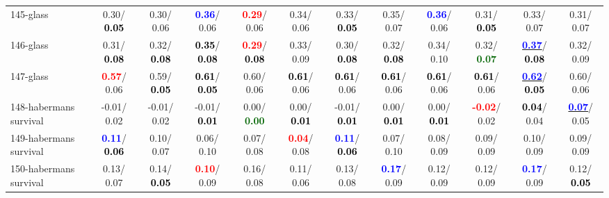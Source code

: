 \begin{table}[h]
\begin{center}
{\begin{tabular}{lc|c|c|c|c|c|c|c|c|c|c}
145-glass &   0.30/\textcolor{black}{\textbf{  0.05}} &   0.30/  0.06 & \textcolor{blue}{\textbf{  0.36}}/  0.06 & \textcolor{red}{\textbf{  0.29}}/  0.06 &   0.34/  0.06 &   0.33/\textcolor{black}{\textbf{  0.05}} &   0.35/  0.07 & \textcolor{blue}{\textbf{  0.36}}/  0.06 &   0.31/\textcolor{black}{\textbf{  0.05}} &   0.33/  0.07 &   0.31/  0.07 \\
146-glass &   0.31/\textcolor{black}{\textbf{  0.08}} &   0.32/\textcolor{black}{\textbf{  0.08}} & \textcolor{black}{\textbf{  0.35}}/\textcolor{black}{\textbf{  0.08}} & \textcolor{red}{\textbf{  0.29}}/\textcolor{black}{\textbf{  0.08}} &   0.33/  0.09 &   0.30/\textcolor{black}{\textbf{  0.08}} &   0.32/\textcolor{black}{\textbf{  0.08}} &   0.34/  0.10 &   0.32/\textcolor{darkgreen}{\textbf{  0.07}} & \underline{\textcolor{blue}{\textbf{  0.37}}}/\textcolor{black}{\textbf{  0.08}} &   0.32/  0.09 \\
147-glass & \textcolor{red}{\textbf{  0.57}}/  0.06 &   0.59/\textcolor{black}{\textbf{  0.05}} & \textcolor{black}{\textbf{  0.61}}/\textcolor{black}{\textbf{  0.05}} &   0.60/  0.06 & \textcolor{black}{\textbf{  0.61}}/  0.06 & \textcolor{black}{\textbf{  0.61}}/  0.06 & \textcolor{black}{\textbf{  0.61}}/  0.06 & \textcolor{black}{\textbf{  0.61}}/  0.06 & \textcolor{black}{\textbf{  0.61}}/  0.06 & \underline{\textcolor{blue}{\textbf{  0.62}}}/\textcolor{black}{\textbf{  0.05}} &   0.60/  0.06 \\
148-habermans survival &  -0.01/  0.02 &  -0.01/  0.02 &  -0.01/\textcolor{black}{\textbf{  0.01}} &   0.00/\textcolor{darkgreen}{\textbf{  0.00}} &   0.00/\textcolor{black}{\textbf{  0.01}} &  -0.01/\textcolor{black}{\textbf{  0.01}} &   0.00/\textcolor{black}{\textbf{  0.01}} &   0.00/\textcolor{black}{\textbf{  0.01}} & \textcolor{red}{\textbf{ -0.02}}/  0.02 & \textcolor{black}{\textbf{  0.04}}/  0.04 & \underline{\textcolor{blue}{\textbf{  0.07}}}/  0.05 \\
149-habermans survival & \textcolor{blue}{\textbf{  0.11}}/\textcolor{black}{\textbf{  0.06}} &   0.10/  0.07 &   0.06/  0.10 &   0.07/  0.08 & \textcolor{red}{\textbf{  0.04}}/  0.08 & \textcolor{blue}{\textbf{  0.11}}/\textcolor{black}{\textbf{  0.06}} &   0.07/  0.10 &   0.08/  0.09 &   0.09/  0.09 &   0.10/  0.09 &   0.09/  0.09 \\ \hline
150-habermans survival &   0.13/  0.07 &   0.14/\textcolor{black}{\textbf{  0.05}} & \textcolor{red}{\textbf{  0.10}}/  0.09 &   0.16/  0.08 &   0.11/  0.06 &   0.13/  0.08 & \textcolor{blue}{\textbf{  0.17}}/  0.09 &   0.12/  0.09 &   0.12/  0.09 & \textcolor{blue}{\textbf{  0.17}}/  0.09 &   0.12/\textcolor{black}{\textbf{  0.05}} \\

\end{tabular}}
\end{center}
\end{table}
